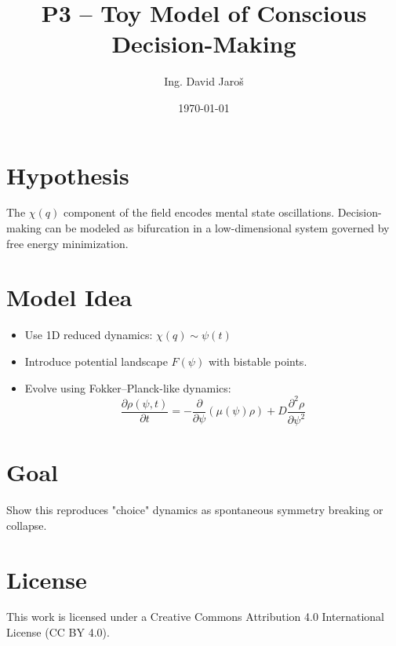 \documentclass[12pt]{article}
\title{P3 – Toy Model of Conscious Decision-Making}
\author{Ing. David Jaroš}
\date{\today}
\begin{document}
\maketitle

\section*{Hypothesis}
The $\chi(q)$ component of the field encodes mental state oscillations. Decision-making can be modeled as bifurcation in a low-dimensional system governed by free energy minimization.

\section*{Model Idea}
\begin{itemize}
\item Use 1D reduced dynamics: $\chi(q) \sim \psi(t)$
\item Introduce potential landscape $F(\psi)$ with bistable points.
\item Evolve using Fokker–Planck-like dynamics:
\[
\frac{\partial \rho(\psi,t)}{\partial t} = -\frac{\partial}{\partial \psi} \left( \mu(\psi) \rho \right) + D \frac{\partial^2 \rho}{\partial \psi^2}
\]
\end{itemize}

\section*{Goal}
Show this reproduces "choice" dynamics as spontaneous symmetry breaking or collapse.


\section*{License}
This work is licensed under a Creative Commons Attribution 4.0 International License (CC BY 4.0).
\end{document}
